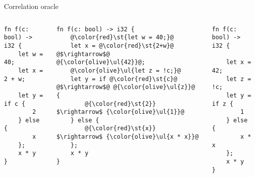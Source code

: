 \documentclass{beamer}
\makeatletter
\let\UL\ul
\renewcommand\ul{%
  \let\set@color\beamerorig@set@color
  \let\reset@color\beamerorig@reset@color
  \UL}
\let\ST\st
\renewcommand\st{%
  \let\set@color\beamerorig@set@color
  \let\reset@color\beamerorig@reset@color
  \ST}
\makeatother
\begin{document}
\begin{frame}[fragile]{Correlation oracle}
\begin{columns}
\begin{column}{0.33\textwidth}
\vspace{0.5em}
\begin{lstlisting}[rulecolor=\color{red!20}]
fn f(c: bool) -> i32 {
    let w = 40;
    let x = 2 + w;
    
    let y = if c {
        2
    } else {
        x
    };
    x * y
}
\end{lstlisting}
\end{column}
\begin{column}{0.33\textwidth}
\vspace{0.5em}
\begin{lstlisting}
fn f(c: bool) -> i32 {
    @\color{red}\st{let w = 40;}@
    let x = @\color{red}\st{2+w}@ @$\rightarrow$@ @{\color{olive}\ul{42}}@;
    @\color{olive}\ul{let z = !c;}@
    let y = if @\color{red}\st{c}@ @$\rightarrow$@ @{\color{olive}\ul{z}}@ {
        @{\color{red}\st{2}} $\rightarrow$ {\color{olive}\ul{1}}@
    } else {
        @{\color{red}\st{x}} $\rightarrow$ {\color{olive}\ul{x * x}}@
    };
    x * y
}
\end{lstlisting}
\end{column}
\begin{column}{0.33\textwidth}
\vspace{0.5em}
\begin{lstlisting}[rulecolor=\color{olive!20}]
fn f(c: bool) -> i32 {
    
    let x = 42;
    let z = !c;
    let y = if z {
        1
    } else {
        x * x
    };
    x * y
}
\end{lstlisting}
\end{column}
\end{columns}
\begin{center}
\end{center}
\end{frame}
\end{document}
